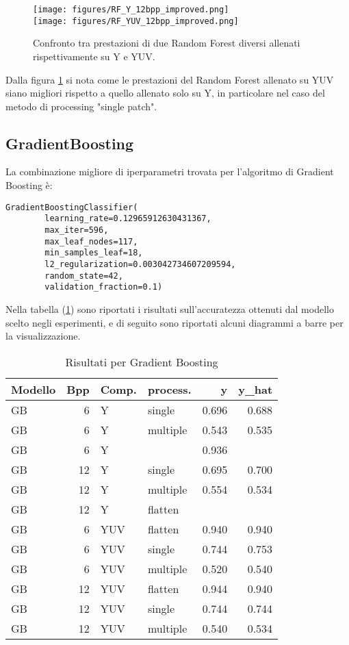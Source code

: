 \begin{figure}[H]
    \centering
    \texttt{[image: figures/RF\_Y\_12bpp\_improved.png]}\\[0.5cm]
    \texttt{[image: figures/RF\_YUV\_12bpp\_improved.png]}
    \caption{Confronto tra prestazioni di due Random Forest diversi allenati rispettivamente su Y e YUV.}
    \label{fig:RF_YUV_plots}
\end{figure}
Dalla figura \ref{fig:RF_YUV_plots} si nota come le prestazioni del Random Forest allenato su YUV siano  migliori rispetto a quello allenato solo su Y, in particolare nel caso del metodo di processing "single patch".

\subsection{GradientBoosting}
La combinazione migliore di iperparametri trovata per l'algoritmo di Gradient Boosting è:
\begin{lstlisting}[style=pythonElegant]
    GradientBoostingClassifier(
        learning_rate=0.12965912630431367,
        max_iter=596,
        max_leaf_nodes=117,
        min_samples_leaf=18,
        l2_regularization=0.003042734607209594,
        random_state=42,
        validation_fraction=0.1)
\end{lstlisting}
Nella tabella (\ref{tab:GB-results-table}) sono riportati i risultati sull'accuratezza ottenuti dal modello scelto negli esperimenti, e di seguito sono riportati alcuni diagrammi a barre per la visualizzazione.
\begin{table}[H]
\centering
\caption{Risultati per Gradient Boosting}
\label{tab:GB-results-table}
\begin{tabular}{lrllrr}
\toprule
Modello &  Bpp &  Comp. &     process. &     y &  y\_hat \\
\midrule
GB &  6 &       Y &   single & 0.696 &  0.688 \\
GB &  6 &       Y & multiple & 0.543 &  0.535 \\
GB &  6 &       Y &  & 0.936 &   \\
GB & 12 &       Y &   single & 0.695 &  0.700 \\
GB & 12 &       Y & multiple & 0.554 &  0.534 \\
GB & 12 &       Y & flatten &  &   \\
\midrule
GB &  6 &     YUV &  flatten & 0.940 &  0.940 \\
GB &  6 &     YUV &   single & 0.744 &  0.753 \\
GB &  6 &     YUV & multiple & 0.520 &  0.540 \\
GB & 12 &     YUV &  flatten & 0.944 &  0.940 \\
GB & 12 &     YUV &   single & 0.744 &  0.744 \\
GB & 12 &     YUV & multiple & 0.540 &  0.534 \\
\bottomrule
\end{tabular}
\end{table}

